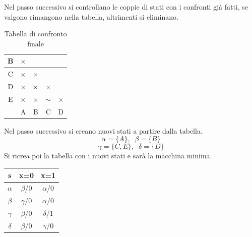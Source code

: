 \documentclass[a4paper]{article}
\theoremstyle{break}
\theoremstyle{break}
\theoremstyle{break}
\theoremstyle{break}
\begin{document}
Nel passo successivo si controllano le coppie di stati con i confronti già fatti, se valgono
rimangono nella tabella, altrimenti si eliminano.
\begin{table}[H]
  \begin{center}
    \begin{tabular}{c|c|c|c|c}
      B & \( \times  \)  &  &  &  \\
      \hline
      C & \( \times  \)  & \( \times \)  &  &  \\
      \hline
      D & \( \times  \)  & \( \times  \)  & \( \times  \)  &  \\
      \hline
      E & \( \times  \)  & \( \times  \)  & \( \sim \)  & \( \times  \)  \\
      \hline
        & A & B & C & D \\
    \end{tabular}
  \end{center}
  \caption{Tabella di confronto finale}
\end{table}
Nel passo successivo si creano nuovi stati a partire dalla tabella.
\[
\alpha = \{A\}, \;\; \beta = \{B\}  
\] 
\[
\gamma= \{C,E\}, \;\; \delta= \{D\}  
\] 
Si ricrea poi la tabella con i nuovi stati e sarà la macchina minima.
\begin{table}[H]
  \begin{center}
    \begin{tabular}{c|c|c}
      s & x=0 & x=1 \\
      \hline
      \( \alpha \)  & \( \beta \)/0 & \( \alpha \)/0 \\
      \( \beta \)  & \( \gamma \)/0 & \( \alpha \)/0 \\
      \( \gamma \)  & \( \beta \)/0 & \( \delta \)/1 \\
      \( \delta \)  & \( \beta \)/0 & \( \gamma \)/0 \\
    \end{tabular}
  \end{center}
\end{table}
\end{document}
